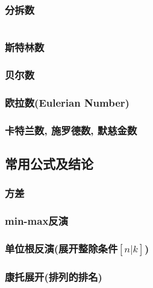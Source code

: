 \documentclass[a4paper, twoside]{article}
\begin{document}
\begin{multicols}{2}
				\subsubsection{分拆数}
					\inputminted{cpp}{../src/math/分拆数.cpp}
				
				\subsubsection{斯特林数}
					
				
				\subsubsection{贝尔数}
					
				
				\subsubsection{欧拉数(Eulerian Number)}
					
				
				\subsubsection{卡特兰数, 施罗德数, 默慈金数}
					\label{catalan}
					
			
			\subsection{常用公式及结论}
				\subsubsection{方差}
					
				
				\subsubsection{min-max反演}
					
				
				\subsubsection{单位根反演(展开整除条件$[n|k]$)}
					
				
				\subsubsection{康托展开(排列的排名)}
					
				

\end{multicols}
\end{document}
